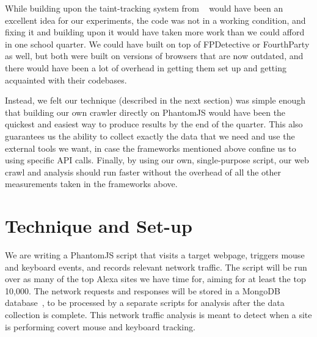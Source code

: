 \documentclass[letterpaper,twocolumn,10pt]{article}
\begin{document}
While building upon the taint-tracking system from ~\cite{tainttracking} would have been an excellent idea for our experiments, the code was not in a working condition, and fixing it and building upon it would have taken more work than we could afford in one school quarter. We could have built on top of FPDetective or FourthParty as well, but both were built on versions of browsers that are now outdated, and there would have been a lot of overhead in getting them set up and getting acquainted with their codebases.

Instead, we felt our technique (described in the next section) was simple enough that building our own crawler directly on PhantomJS would have been the quickest and easiest way to produce results by the end of the quarter. This also guarantees us the ability to collect exactly the data that we need and use the external tools we want, in case the frameworks mentioned above confine us to using specific API calls. Finally, by using our own, single-purpose script, our web crawl and analysis should run faster without the overhead of all the other measurements taken in the frameworks above.

\section{Technique and Set-up}

We are writing a PhantomJS script that visits a target webpage, triggers mouse and keyboard events, and records relevant network traffic. The script will be run over as many of the top Alexa sites we have time for, aiming for at least the top 10,000. The network requests and responses will be stored in a MongoDB database~\cite{mongodb}, to be processed by a separate scripts for analysis after the data collection is complete. This network traffic analysis is meant to detect when a site is performing covert mouse and keyboard tracking.
\end{document}
